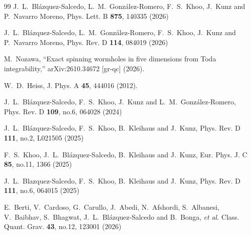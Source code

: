 \documentclass[aps,prl,reprint,superscriptaddress,nofootinbib,floatfix]{revtex4-2}
\begin{document}
\begin{thebibliography}{99}
J.~L.~Bl{\'a}zquez-Salcedo, L.~M.~Gonz{\'a}lez-Romero, F.~S.~Khoo, J.~Kunz and P.~Navarro Moreno,
Phys. Lett. B \textbf{875}, 140335 (2026)

J.~L.~Bl{\'a}zquez-Salcedo, L.~M.~Gonz{\'a}lez-Romero, F.~S.~Khoo, J.~Kunz and P.~Navarro Moreno,
Phys. Rev. D \textbf{114}, 084019 (2026)



M.~Nozawa, 
``Exact spinning wormholes in five dimensions from Toda integrability,''
arXiv:2610.34672 [gr-qc] (2026).

W.~D.~Heiss, 
J. Phys. A \textbf{45}, 444016 (2012).

J.~L.~Bl{\'a}zquez-Salcedo, F.~S.~Khoo, J.~Kunz and L.~M.~Gonz{\'a}lez-Romero,
Phys. Rev. D \textbf{109}, no.6, 064028 (2024)

J.~L.~Bl{\'a}zquez-Salcedo, F.~S.~Khoo, B.~Kleihaus and J.~Kunz,
Phys. Rev. D \textbf{111}, no.2, L021505 (2025)

F.~S.~Khoo, J.~L.~Bl{\'a}zquez-Salcedo, B.~Kleihaus and J.~Kunz,
Eur. Phys. J. C \textbf{85}, no.11, 1366 (2025)

J.~L.~Blazquez-Salcedo, F.~S.~Khoo, B.~Kleihaus and J.~Kunz,
Phys. Rev. D \textbf{111}, no.6, 064015 (2025)

E.~Berti, V.~Cardoso, G.~Carullo, J.~Abedi, N.~Afshordi, S.~Albanesi, V.~Baibhav, S.~Bhagwat, J.~L.~Bl{\'a}zquez-Salcedo and B.~Bonga, \textit{et al.}
Class. Quant. Grav. \textbf{43}, no.12, 123001 (2026)

\end{thebibliography}
\end{document}
